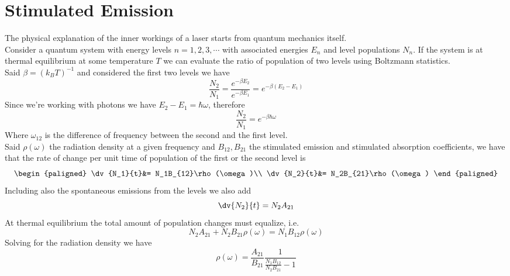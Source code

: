 \documentclass[../electromagnetism.tex]{subfiles}
\begin{document}
\section{Stimulated Emission}
The physical explanation of the inner workings of a laser starts from quantum mechanics itself.\\
Consider a quantum system with energy levels $n=1, 2, 3,\cdots$ with associated energies $E_n$ and level populations $N_n$. If the system is at thermal equilibrium at some temperature $T$ we can evaluate the ratio of population of two levels using Boltzmann statistics.\\
Said $\beta=\left( k_BT \right)^{-1}$ and considered the first two levels we have
\begin{equation}
	\frac{N_2}{N_1}=\frac{e^{-\beta E_2}}{e^{-\beta E_1}}=e^{-\beta\left( E_2-E_1 \right)}
	\label{eq:levelpop.se}
\end{equation}
Since we're working with photons we have $E_2-E_1=\hbar\omega$, therefore
\begin{equation}
	\frac{N_2}{N_1}=e^{-\beta\hbar\omega}
	\label{eq:touse.se}
\end{equation}
Where $\omega_{12}$ is the difference of frequency between the second and the first level.\\
Said $\rho(\omega)$ the radiation density at a given frequency and $B_{12}, B_{21}$ the stimulated emission and stimulated absorption coefficients, we have that the rate of change per unit time of population of the first or the second level is
\begin{equation}
	\begin{paligned}
		\dv{N_1}{t}&= N_1B_{12}\rho(\omega)\\
		\dv{N_2}{t}&= N_2B_{21}\rho(\omega)
	\end{paligned}
	\label{eq:stimulated.se}
\end{equation}
Including also the spontaneous emissions from the levels we also add
\begin{equation}
	\dv{N_2}{t}=N_2A_{21}
	\label{eq:spontaneous.se}
\end{equation}
At thermal equilibrium the total amount of population changes must equalize, i.e.
\begin{equation}
	N_2A_{21}+N_2B_{21}\rho(\omega)=N_1B_{12}\rho(\omega)
	\label{eq:thermaleq.se}
\end{equation}
Solving for the radiation density we have 
\begin{equation}
	\rho(\omega)=\frac{A_{21}}{B_{21}}\frac{1}{\frac{N_1B_{12}}{N_2B_{21}}-1}
	\label{eq:density.se}
\end{equation}
\end{document}
